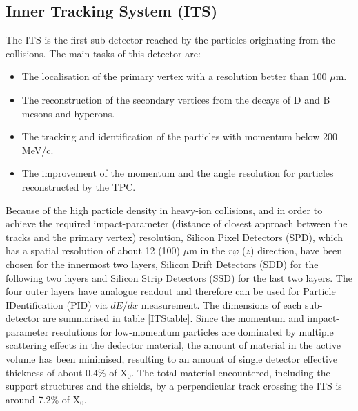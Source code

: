 \documentclass[b5paper,10pt,twoside,oldstyle,classica]{toptesi}
\begin{document}
\subsection{Inner Tracking System (ITS)}
\label{ITS_sec}
The ITS \cite{Nooren:2007zz} is the first sub-detector reached by the particles originating from the collisions. The main tasks of this detector are:
\begin{itemize}
\item The localisation of the primary vertex with a resolution better than 100 $\mu$m.
\item The reconstruction of the secondary vertices from the decays of D and B mesons and hyperons.
\item The tracking and identification of the particles with momentum below 200 MeV/c. 
\item The improvement of the momentum and the angle resolution for particles reconstructed by the TPC.
\end{itemize}
Because of the high particle density in heavy-ion collisions, and in order to achieve the required impact-parameter (distance of closest approach between the tracks and the primary vertex) resolution, Silicon Pixel Detectors (SPD), which has a spatial resolution of about 12 (100) $\mu$m in the $r\varphi$ ($z$) direction, have been chosen for the innermost two layers, Silicon Drift Detectors (SDD) for the following two layers and Silicon Strip Detectors (SSD) for the last two layers. The four outer layers have analogue readout and therefore can be used for Particle IDentification (PID) via $dE/dx$ measurement. 
The dimensions of each sub-detector are summarised in table \ref{ITStable}. Since the momentum and impact-parameter resolutions for low-momentum particles are dominated by multiple scattering effects in the dedector material, the amount of material in the active volume has been minimised, resulting to an amount of single detector effective thickness of about 0.4\% of X$_0$. The total material encountered, including the support structures and the shields, by a perpendicular track crossing the ITS is around 7.2\% of X$_0$.
\end{document}
